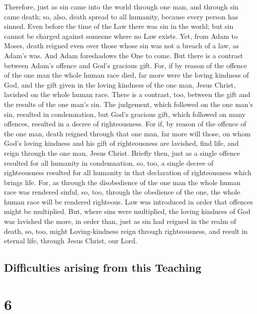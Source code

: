 Therefore, just as sin came into the world through one
man, and through sin came death; so, also, death spread to all humanity,
because every person has sinned.  Even before the time of
the Law there was sin in the world; but sin cannot be charged against
someone where no Law exists.  Yet, from Adam to Moses,
death reigned even over those whose sin was not a breach of a law, as
Adam's was. And Adam foreshadows the One to come.  But
there is a contrast between Adam's offence and God's gracious gift. For,
if by reason of the offence of the one man the whole human race died,
far more were the loving kindness of God, and the gift given in the
loving kindness of the one man, Jesus Christ, lavished on the whole
human race.  There is a contrast, too, between the gift and
the results of the one man's sin. The judgement, which followed on the
one man's sin, resulted in condemnation, but God's gracious gift, which
followed on many offences, resulted in a decree of righteousness.
 For if, by reason of the offence of the one man, death
reigned through that one man, far more will those, on whom God's loving
kindness and his gift of righteousness are lavished, find life, and
reign through the one man, Jesus Christ.  Briefly then,
just as a single offence resulted for all humanity in condemnation, so,
too, a single decree of righteousness resulted for all humanity in that
declaration of righteousness which brings life.  For, as
through the disobedience of the one man the whole human race was
rendered sinful, so, too, through the obedience of the one, the whole
human race will be rendered righteous.  Law was introduced
in order that offences might be multiplied. But, where sins were
multiplied, the loving kindness of God was lavished the more,
 in order than, just as sin had reigned in the realm of
death, so, too, might Loving-kindness reign through righteousness, and
result in eternal life, through Jesus Christ, our Lord.

\hypertarget{difficulties-arising-from-this-teaching}{%
\subsection{Difficulties arising from this
Teaching}\label{difficulties-arising-from-this-teaching}}

\hypertarget{section-5}{%
\section{6}\label{section-5}}

